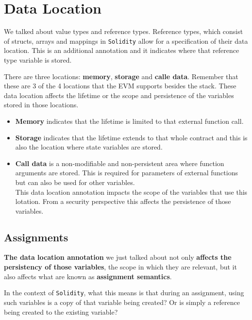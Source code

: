\section{Data Location}\label{data-location}

We talked about value types and reference types. Reference types, which
consist of structs, arrays and mappings in \texttt{Solidity} allow for a
specification of their data location. This is an additional annotation
and it indicates where that reference type variable is stored.

There are three locations: \textbf{memory}, \textbf{storage} and
\textbf{calle data}. Remember that these are 3 of the 4 locations that
the EVM supports besides the stack. These data location affects the
lifetime or the scope and persistence of the variables stored in those
locations.

\begin{itemize}
\item
  \textbf{Memory} indicates that the lifetime is limited to that
  external function call.
\item
  \textbf{Storage} indicates that the lifetime extends to that whole
  contract and this is also the location where state variables are
  stored.
\item
  \textbf{Call data} is a non-modifiable and non-persistent area where
  function arguments are stored. This is required for parameters of
  external functions but can also be used for other variables.\\

  This data location annotation impacts the scope of the variables that
  use this lotation. From a security perspective this affects the
  persistence of those variables.
\end{itemize}

\subsection{Assignments}\label{assignments}

\textbf{The data location annotation} we just talked about not only
\textbf{affects the persistency of those variables}, the scope in which
they are relevant, but it also affects what are known as
\textbf{assignment semantics}.

In the context of \texttt{Solidity}, what this means is that during an
assignment, using such variables is a copy of that variable being
created? Or is simply a reference being created to the existing
variable?

